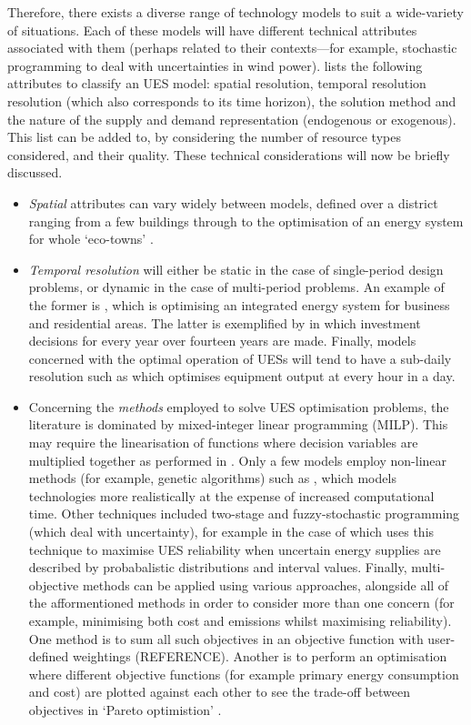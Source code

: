 Therefore, there exists a diverse range of technology models to suit a wide-variety of situations. Each of these models will have different technical attributes associated with them (perhaps related to their contexts---for example, stochastic programming to deal with uncertainties in wind power). \citet{Kierstead2012b} lists the following attributes to classify an UES model: spatial resolution, temporal resolution resolution (which also corresponds to its time horizon), the solution method and the nature of the supply and demand representation (endogenous or exogenous). This list can be added to, by considering the number of resource types considered, and their quality. These technical considerations will now be briefly discussed.
\begin{itemize}
	\item \emph{Spatial} attributes can vary widely between models, defined over a district ranging from a few buildings \citep{Bojic2010} through to the optimisation of an energy system for whole `eco-towns' \citep{Keirstead2012}. 
	\item \emph{Temporal resolution} will either be static in the case of single-period design problems, or dynamic in the case of multi-period problems. An example of the former is \citet{Sugihara2004}, which is optimising an integrated energy system for business and residential areas. The latter is exemplified by\citet{Siriputtisak2009} in which investment decisions for every year over fourteen years are made. Finally, models concerned with the optimal operation of UESs will tend to have a sub-daily resolution such as \citet{Ooka2009} which optimises equipment output at every hour in a day. 
	\item Concerning the \emph{methods} employed to solve UES optimisation problems, the literature is dominated by mixed-integer linear programming (MILP). This may require the linearisation of functions where decision variables are multiplied together as performed in \citet{Siriputtisak2009}. Only a few models employ non-linear methods (for example, genetic algorithms) such as \citet{Ooka2009}, which models technologies more realistically at the expense of increased computational time. Other techniques included two-stage and fuzzy-stochastic programming (which deal with uncertainty), for example in the case of \citet{Cai2009a} which uses this technique to maximise UES reliability when uncertain energy supplies are described by probabalistic distributions and interval values. Finally, multi-objective methods can be applied using various approaches, alongside all of the afformentioned methods in order to consider more than one concern (for example, minimising both cost and emissions whilst maximising reliability). One method is to sum all such objectives in an objective function with user-defined weightings (REFERENCE). Another is to perform an optimisation where different objective functions (for example primary energy consumption and cost) are plotted against each other to see the trade-off between objectives in `Pareto optimistion' \citep{Sugihara2004}.

\end{itemize}
